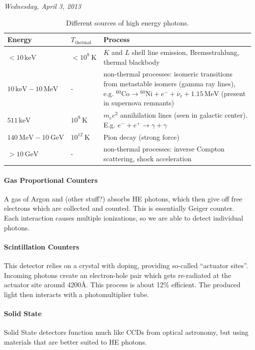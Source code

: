 \documentclass[10pt]{article}
\numberwithin{equation}{section}
\newcommand{\n}{\noindent}
\begin{document}
		\n \textit{Wednesday, April 3, 2013}\\
		
		\begin{table}[b]
			\centering
			\begin{tabular}{llp{3in}}	
			Energy & $T_{\mathrm{thermal}}$ & Process\\
			\hline
			$< 10\,\mathrm{keV}$ & $< 10^8\ \mathrm{K}$ & $K$ and $L$ shell line emission, Bremsstrahlung, thermal blackbody\\
			$10\,\mathrm{keV} - 10\,\mathrm{MeV}$ & - & non-thermal processes: isomeric transitions from metastable isomers (gamma ray lines), e.g. ${}^{60}\mathrm{Co} \to {}^{60}\mathrm{Ni}+e^- + \bar{\nu}_e + 1.15\,\mathrm{MeV}$ (present in supernova remnants)\\
			$511\,\mathrm{keV}$ & $10^9\ \mathrm{K}$ & $m_ec^2$ annihilation lines (seen in galactic center). E.g. $e^-+e^+ \to \gamma+\gamma$\\
			$140\ \mathrm{MeV} - 10\ \mathrm{GeV}$ & $10^{12}\ \mathrm{K}$ & Pion decay (strong force)\\
			$>10\ \mathrm{GeV}$ & - & non-thermal processes: inverse Compton scattering, shock acceleration
			\end{tabular}
			\caption{Different sources of high energy photons.}
			\label{tab:3}
		\end{table}
		
		\paragraph{Gas Proportional Counters} A gas of Argon and (other stuff?) absorbs HE photons, which then give off free electrons which are collected and counted. This is essentially Geiger counter. Each interaction causes multiple ionizations, so we are able to detect individual photons.
		
		\paragraph{Scintillation Counters} This detector relies on a crystal with doping, providing so-called ``actuator sites''. Incoming photons create an electron-hole pair which gets re-radiated at the actuator site around 4200\AA. This process is about 12\% efficient. The produced light then interacts with a photomultiplier tube.
		
		\paragraph{Solid State} Solid State detectors function much like CCDs from optical astronomy, but using materials that are better suited to HE photons.\\
		
\end{document}
